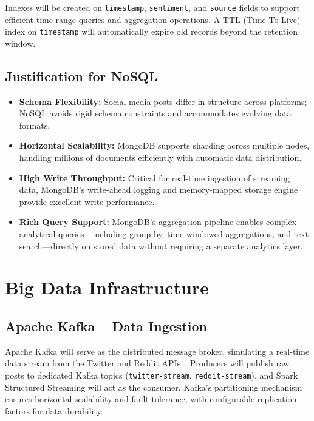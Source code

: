 \documentclass[conference]{IEEEtran}
\begin{document}
Indexes will be created on \texttt{timestamp}, \texttt{sentiment}, and \texttt{source} fields to support efficient time-range queries and aggregation operations. A TTL (Time-To-Live) index on \texttt{timestamp} will automatically expire old records beyond the retention window.

\subsection{Justification for NoSQL}
\begin{itemize}[leftmargin=*]
    \item \textbf{Schema Flexibility:} Social media posts differ in structure across platforms; NoSQL avoids rigid schema constraints and accommodates evolving data formats.
    \item \textbf{Horizontal Scalability:} MongoDB supports sharding across multiple nodes, handling millions of documents efficiently with automatic data distribution.
    \item \textbf{High Write Throughput:} Critical for real-time ingestion of streaming data, MongoDB's write-ahead logging and memory-mapped storage engine provide excellent write performance.
    \item \textbf{Rich Query Support:} MongoDB's aggregation pipeline enables complex analytical queries---including group-by, time-windowed aggregations, and text search---directly on stored data without requiring a separate analytics layer.
\end{itemize}

\section{Big Data Infrastructure}

\subsection{Apache Kafka -- Data Ingestion}
Apache Kafka will serve as the distributed message broker, simulating a real-time data stream from the Twitter and Reddit APIs~\cite{kreps2011kafka}. Producers will publish raw posts to dedicated Kafka topics (\texttt{twitter-stream}, \texttt{reddit-stream}), and Spark Structured Streaming will act as the consumer. Kafka's partitioning mechanism ensures horizontal scalability and fault tolerance, with configurable replication factors for data durability.
\end{document}

